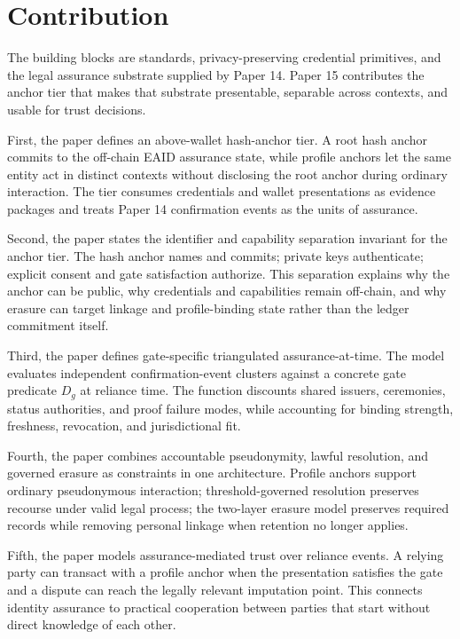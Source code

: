\documentclass[oneside,10pt]{swissi}
\begin{document}
\bigskip

\section{Contribution}
\label{sec:contribution}

The building blocks are standards, privacy-preserving credential primitives, and the legal assurance substrate supplied by Paper 14. Paper 15 contributes the anchor tier that makes that substrate presentable, separable across contexts, and usable for trust decisions.

First, the paper defines an above-wallet hash-anchor tier. A root hash anchor commits to the off-chain EAID assurance state, while profile anchors let the same entity act in distinct contexts without disclosing the root anchor during ordinary interaction. The tier consumes credentials and wallet presentations as evidence packages and treats Paper 14 confirmation events as the units of assurance.

Second, the paper states the identifier and capability separation invariant for the anchor tier. The hash anchor names and commits; private keys authenticate; explicit consent and gate satisfaction authorize. This separation explains why the anchor can be public, why credentials and capabilities remain off-chain, and why erasure can target linkage and profile-binding state rather than the ledger commitment itself.

Third, the paper defines gate-specific triangulated assurance-at-time. The model evaluates independent confirmation-event clusters against a concrete gate predicate $D_g$ at reliance time. The function discounts shared issuers, ceremonies, status authorities, and proof failure modes, while accounting for binding strength, freshness, revocation, and jurisdictional fit.

Fourth, the paper combines accountable pseudonymity, lawful resolution, and governed erasure as constraints in one architecture. Profile anchors support ordinary pseudonymous interaction; threshold-governed resolution preserves recourse under valid legal process; the two-layer erasure model preserves required records while removing personal linkage when retention no longer applies.

Fifth, the paper models assurance-mediated trust over reliance events. A relying party can transact with a profile anchor when the presentation satisfies the gate and a dispute can reach the legally relevant imputation point. This connects identity assurance to practical cooperation between parties that start without direct knowledge of each other.
\end{document}
